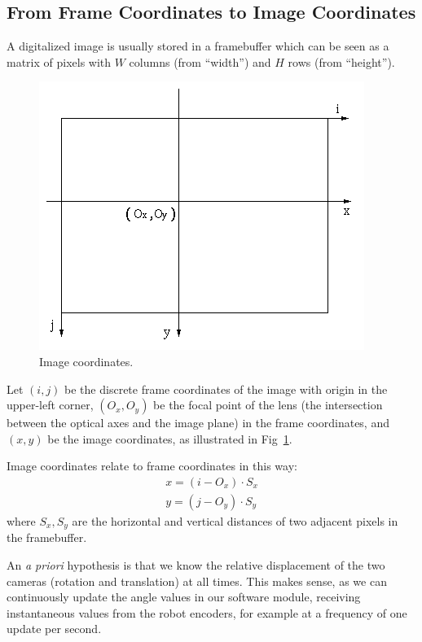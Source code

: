 \subsection{From Frame Coordinates to Image Coordinates}

A digitalized image is usually stored in a framebuffer which can be seen as a matrix of pixels with $W$ columns (from ``width'') and $H$ rows (from ``height'').

\begin{figure}
\centering
\includegraphics[scale=0.55]{figures/image_coords}
\caption[Image coordinates]{Image coordinates.}
\label{img:image_coords}
\end{figure}

Let $(i,j)$ be the discrete frame coordinates of the image with origin in the upper-left corner, $(O_x,O_y)$ be the focal point of the lens (the intersection between the optical axes and the image plane) in the frame coordinates, and $(x,y)$ be the image coordinates, as illustrated in Fig~\ref{img:image_coords}.

Image coordinates relate to frame coordinates in this way:
\begin{gather}
x = (i - O_x) \cdot S_x \\
y = (j - O_y) \cdot S_y
\end{gather}
where $S_x,S_y$ are the horizontal and vertical distances of two adjacent pixels in the framebuffer.

\bigskip


An \emph{a priori} hypothesis is that we know the relative displacement of the two cameras (rotation and translation) at all times. This makes sense, as we can continuously update the angle values in our software module, receiving instantaneous values from the robot encoders, for example at a frequency of one update per second.

